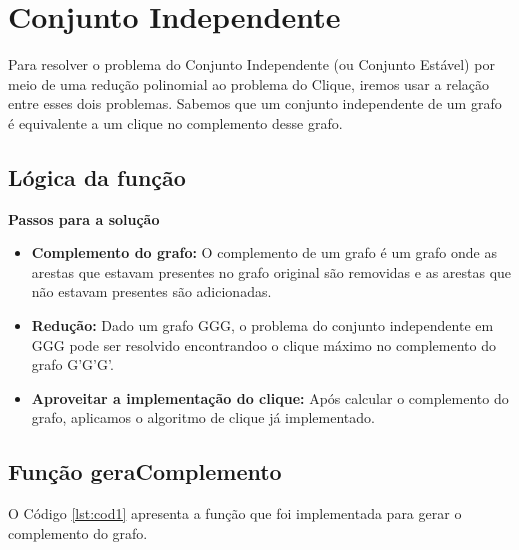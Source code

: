 \documentclass[12pt]{article}
\begin{document}
\clearpage
\section{Conjunto Independente}
    Para resolver o problema do Conjunto Independente (ou Conjunto Estável) por meio de uma redução polinomial ao problema do Clique, iremos usar a relação entre esses dois problemas. Sabemos que um conjunto independente de um grafo é equivalente a um clique no complemento desse grafo.\\
    
    \subsection{Lógica da função} \textbf{Passos para a solução}
    \begin{itemize}
        \item \textbf{Complemento do grafo:} O complemento de um grafo é um grafo onde as arestas que estavam presentes no grafo original são removidas e as arestas que não estavam presentes são adicionadas.
        \item \textbf{Redução:} Dado um grafo GGG, o problema do conjunto independente em GGG pode ser resolvido encontrandoo o clique máximo no complemento do grafo G'G'G'.
        \item \textbf{Aproveitar a implementação do clique:} Após calcular o complemento do grafo, aplicamos o algoritmo de clique já implementado.\\
    \end{itemize}


\subsection{Função geraComplemento}

O Código \ref{lst:cod1} apresenta a função que foi implementada para gerar o complemento do grafo.
\end{document}
